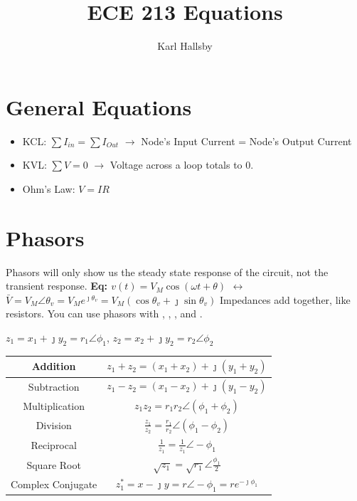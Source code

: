 \documentclass[10pt,letterpaper,final,twoside,notitlepage]{article}
\author{Karl Hallsby}
\title{ECE 213 Equations}
\begin{document}
\section*{General Equations}
	\begin{itemize}[noitemsep] %
		\item KCL: $\sum I_{in} = \sum I_{Out}$ $\rightarrow$ Node's Input Current = Node's Output Current
		\item KVL: $\sum V = 0$ $\rightarrow$ Voltage across a loop totals to 0.
		\item Ohm's Law: $V=IR$
	\end{itemize}

\section*{Phasors} \label{sec:Phasors}
Phasors will only show us the steady state response of the circuit, not the transient response. \newline 
\textbf{\large Eq: $v(t)=V_{M} \cos \left(\omega t + \theta \right)$ $\leftrightarrow$ $\bar{V}=V_{M} \angle \theta_{v} = V_{M}e^{\jmath \theta_{v}} = V_{M}\left(\cos \theta_{v} + \jmath \sin \theta_{v}\right)$} \newline
Impedances add together, like resistors.
You can use phasors with , , , and . \newline
	\begin{table}[ht] %
		\centering
		\renewcommand{\arraystretch}{1.4}
		$z_1=x_1+\jmath y_2=r_1\angle\phi_1$, $z_2=x_2+\jmath y_2=r_2\angle\phi_2$
		\begin{tabular}{|c|c|} 
			\hline
			Addition & $z_1+z_2=\left( x_1+x_2 \right)+ \jmath \left( y_1+y_2 \right)$ \\ \hline
			Subtraction & $z_1-z_2=\left( x_1-x_2 \right)+ \jmath \left( y_1-y_2 \right)$ \\ \hline
			Multiplication & $z_{1}z_{2}=r_{1}r_{2}\angle \left( \phi_1 + \phi_2 \right)$ \\ \hline
			Division & $\frac{z_{1}}{z_{2}} = \frac{r_{1}}{r_{2}} \angle \left(\phi_1 - \phi_2 \right)$ \\ \hline
			Reciprocal & $\frac{1}{z_1}=\frac{1}{z_1} \angle -\phi_1$ \\ \hline
			Square Root & $\sqrt{z_1}=\sqrt{r_1} \angle \frac{\phi_1}{2}$ \\ \hline
			Complex Conjugate & $ z_1^*=x- \jmath y=r \angle -\phi_1=re^{-\jmath \phi_1}$\\ \hline
		\end{tabular}
	\end{table}
\end{document}
